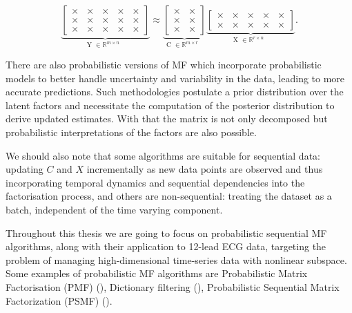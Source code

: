\documentclass{mldsmsc}
\begin{document}
\begin{equation}
\underbrace{
\begin{bmatrix}
  \times & \times & \times & \times & \times \\
  \times & \times & \times & \times & \times \\
  \times & \times & \times & \times & \times
\end{bmatrix}
}_{\text{Y $\in \mathbb{R}^{m \times n}$ }}
\approx
\underbrace{
\begin{bmatrix}
  \times & \times \\
  \times & \times \\
  \times & \times
\end{bmatrix}
}_{\text{C $\in \mathbb{R}^{m \times r}$ }}
\underbrace{
\begin{bmatrix}
  \times & \times & \times & \times & \times \\
  \times & \times & \times & \times & \times
\end{bmatrix}
}_{\text{X $\in \mathbb{R}^{r \times n}$ }}.
\end{equation}

\noindent There are also probabilistic versions of MF which incorporate probabilistic models to better handle uncertainty and variability in the data, leading to more accurate predictions. Such methodologies postulate a prior distribution over the latent factors and necessitate the computation of the posterior distribution to derive updated estimates. With that the matrix is not only decomposed but probabilistic interpretations of the factors are also possible. \newline

\noindent We should also note that some algorithms are suitable for sequential data: updating $C$ and $X$ incrementally as new data points are observed and thus incorporating temporal dynamics and sequential dependencies into the factorisation process, and others are non-sequential: treating the dataset as a batch, independent of the time varying component. \newline

\noindent Throughout this thesis we are going to focus on probabilistic sequential MF algorithms, along with their application to 12-lead ECG data, targeting the problem of managing high-dimensional time-series data with nonlinear subspace. Some examples of probabilistic MF algorithms are Probabilistic Matrix Factorisation (PMF) (\cite{NIPS2007_d7322ed7}), Dictionary filtering (\cite{cite-key}), Probabilistic Sequential Matrix Factorization (PSMF) (\cite{akyildiz2021probabilistic}). \newline
\end{document}
